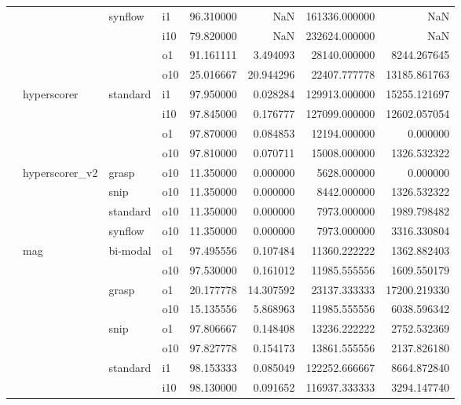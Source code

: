 \begin{longtable}{llllrrrr}
      &     & synflow & i1 &  96.310000 &        NaN &    161336.000000 &           NaN \\
      &     &         & i10 &  79.820000 &        NaN &    232624.000000 &           NaN \\
      &     &         & o1 &  91.161111 &   3.494093 &     28140.000000 &   8244.267645 \\
      &     &         & o10 &  25.016667 &  20.944296 &     22407.777778 &  13185.861763 \\
      & hyperscorer & standard & i1 &  97.950000 &   0.028284 &    129913.000000 &  15255.121697 \\
      &     &         & i10 &  97.845000 &   0.176777 &    127099.000000 &  12602.057054 \\
      &     &         & o1 &  97.870000 &   0.084853 &     12194.000000 &      0.000000 \\
      &     &         & o10 &  97.810000 &   0.070711 &     15008.000000 &   1326.532322 \\
      & hyperscorer\_v2 & grasp & o10 &  11.350000 &   0.000000 &      5628.000000 &      0.000000 \\
      &     & snip & o10 &  11.350000 &   0.000000 &      8442.000000 &   1326.532322 \\
      &     & standard & o10 &  11.350000 &   0.000000 &      7973.000000 &   1989.798482 \\
      &     & synflow & o10 &  11.350000 &   0.000000 &      7973.000000 &   3316.330804 \\
      & mag & bi-modal & o1 &  97.495556 &   0.107484 &     11360.222222 &   1362.882403 \\
      &     &         & o10 &  97.530000 &   0.161012 &     11985.555556 &   1609.550179 \\
      &     & grasp & o1 &  20.177778 &  14.307592 &     23137.333333 &  17200.219330 \\
      &     &         & o10 &  15.135556 &   5.868963 &     11985.555556 &   6038.596342 \\
      &     & snip & o1 &  97.806667 &   0.148408 &     13236.222222 &   2752.532369 \\
      &     &         & o10 &  97.827778 &   0.154173 &     13861.555556 &   2137.826180 \\
      &     & standard & i1 &  98.153333 &   0.085049 &    122252.666667 &   8664.872840 \\
      &     &         & i10 &  98.130000 &   0.091652 &    116937.333333 &   3294.147740 \\

\end{longtable}
